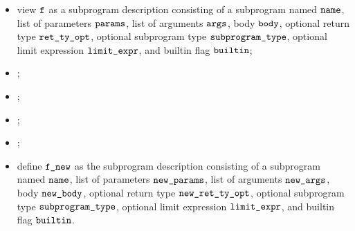 \ProseParagraph
\AllApply
\begin{itemize}
  \item view $\texttt{f}$ as a subprogram description consisting of a subprogram named $\texttt{name}$,
        list of parameters $\params$, list of arguments $\args$, body $\vbody$,
        optional return type $\rettyopt$, optional subprogram type $\texttt{subprogram\_type}$,
        optional limit expression $\texttt{limit\_expr}$, and builtin flag $\texttt{builtin}$;
  \item \Proserenamelocalsargs{$\args$}{$\newargs$};
  \item \Proserenamelocalsnamedargs{$\params$}{$\newparams$};
  \item \Proserenamelocalsstmt{$\vbody$}{$\vnewbody$};
  \item \Prosemapopt{$\renamelocalsty$}{$\rettyopt$}{\\ $\newrettyopt$};
  \item define $\texttt{f\_new}$ as the subprogram description consisting of a subprogram named $\texttt{name}$,
    list of parameters $\newparams$, list of arguments $\newargs$, body $\vnewbody$,
    optional return type $\newrettyopt$, optional subprogram type $\texttt{subprogram\_type}$,
    optional limit expression $\texttt{limit\_expr}$, and builtin flag $\texttt{builtin}$.
\end{itemize}

